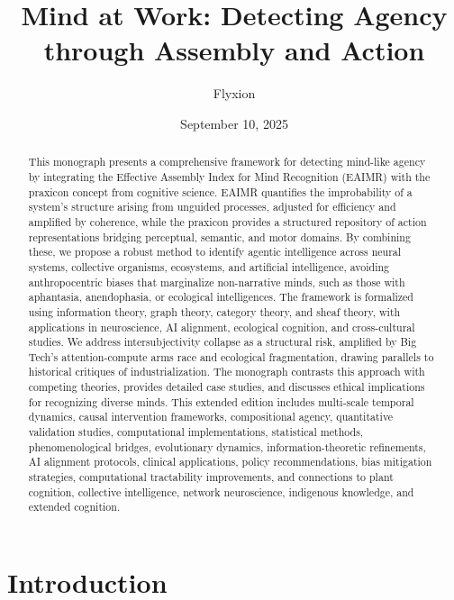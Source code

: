 \documentclass{article}
\title{Mind at Work: Detecting Agency through Assembly and Action}
\author{Flyxion}
\date{September 10, 2025}
\begin{document}
\maketitle

\begin{abstract}
This monograph presents a comprehensive framework for detecting mind-like agency by integrating the Effective Assembly Index for Mind Recognition (EAIMR) with the praxicon concept from cognitive science. EAIMR quantifies the improbability of a system’s structure arising from unguided processes, adjusted for efficiency and amplified by coherence, while the praxicon provides a structured repository of action representations bridging perceptual, semantic, and motor domains. By combining these, we propose a robust method to identify agentic intelligence across neural systems, collective organisms, ecosystems, and artificial intelligence, avoiding anthropocentric biases that marginalize non-narrative minds, such as those with aphantasia, anendophasia, or ecological intelligences. The framework is formalized using information theory, graph theory, category theory, and sheaf theory, with applications in neuroscience, AI alignment, ecological cognition, and cross-cultural studies. We address intersubjectivity collapse as a structural risk, amplified by Big Tech’s attention-compute arms race and ecological fragmentation, drawing parallels to historical critiques of industrialization. The monograph contrasts this approach with competing theories, provides detailed case studies, and discusses ethical implications for recognizing diverse minds. This extended edition includes multi-scale temporal dynamics, causal intervention frameworks, compositional agency, quantitative validation studies, computational implementations, statistical methods, phenomenological bridges, evolutionary dynamics, information-theoretic refinements, AI alignment protocols, clinical applications, policy recommendations, bias mitigation strategies, computational tractability improvements, and connections to plant cognition, collective intelligence, network neuroscience, indigenous knowledge, and extended cognition.
\end{abstract}

\section{Introduction}
\label{sec:introduction}
\end{document}
